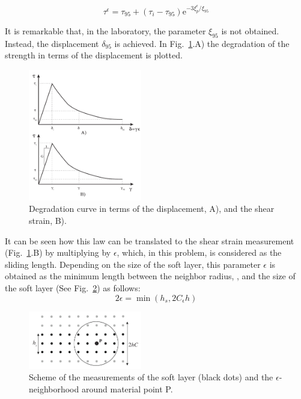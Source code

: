 \documentclass[applsci,journal,article,submit,moreauthors,pdftex]{Definitions/mdpi}
\begin{document}
\begin{equation} \label{eq19}
\tau^{\epsilon}=\tau_{95}+\left(\tau_{i}-\tau_{95}\right) \mathrm{e}^{-3 \xi^{\epsilon}_{p} / \xi_{95}}
\end{equation}

It is remarkable that, in the laboratory, the parameter $\xi_{95}$ is not obtained. Instead, the displacement $\delta_{95}$ is achieved. In Fig.~\ref{fig_deg}.A) the degradation of the strength in terms of the displacement is plotted.
\begin{figure}
\centering
\includegraphics[width=0.44\textwidth]{Figs/degradation.pdf}
\caption{Degradation curve in terms of the displacement, A), and the shear strain, B).}
\label{fig_deg}
\end{figure}
 It can be seen how this law can be translated to the shear strain measurement (Fig.~\ref{fig_deg}.B) by multiplying by $\epsilon$, which, in this problem, is considered as the sliding length. Depending on the size of the soft layer, this parameter $\epsilon$ is obtained as the minimum length between the neighbor radius, \cite{Navas2018a}, and the size of the soft layer (See Fig.~\ref{fig_layer}) as follows:
 \begin{equation} \label{eq20}
2\epsilon = \min(h_s,2C_\epsilon h)
\end{equation}
\begin{figure}
\centering
\includegraphics[width=0.44\textwidth]{Figs/soft_layer.pdf}
\caption{Scheme of the measurements of the soft layer (black dots) and the $\epsilon$-neighborhood around material point P.}
\label{fig_layer}
\end{figure}
\end{document}
